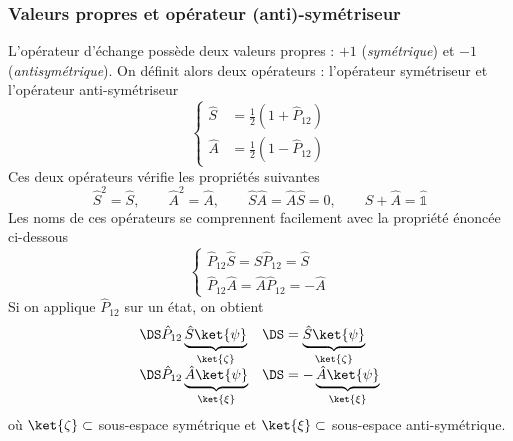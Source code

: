\subsubsection{Valeurs propres et opérateur (anti)-symétriseur}
L'opérateur d'échange possède deux valeurs propres : $+1$ (\textit{symétrique}) et $-1$ (\textit{antisymétrique}). On 
définit alors deux opérateurs : l'opérateur symétriseur et l'opérateur anti-symétriseur
\begin{equation}
\left\{\begin{array}{ll}
\hat{S} &= \frac{1}{2}\left(1+\hat{P}_{12}\right)\\
\hat{A} &= \frac{1}{2}\left(1-\hat{P}_{12}\right)
\end{array}\right.
\end{equation}
Ces deux opérateurs vérifie les propriétés suivantes
\begin{equation}
\hat{S}^2 =\hat{S},\qquad \hat{A}^2=\hat{A},\qquad \hat{S}\hat{A}=\hat{A}\hat{S} = 0, \qquad \hat{S}+\hat{A}=\hat{\mathbb{1}}
\end{equation}
Les noms de ces opérateurs se comprennent facilement avec la propriété énoncée ci-dessous
\begin{equation}
\left\{\begin{array}{ll}
\hat{P}_{12}\hat{S} = \hat{S}\hat{P}_{12} = \hat{S}\\
\hat{P}_{12}\hat{A} = \hat{A}\hat{P}_{12} = -\hat{A}
\end{array}\right.
\end{equation}
Si on applique $\hat{P}_{12}$ sur un état, on obtient
\begin{equation}
\begin{array}{ll}
\DS\hat{P}_{12}\underbrace{\hat{S}\ket{\psi}}_{\ket{\zeta}}&\DS=\underbrace{\hat{S}\ket{\psi}}_{\ket{\zeta}}\\
\DS\hat{P}_{12}\underbrace{\hat{A}\ket{\psi}}_{\ket{\xi}}&\DS=-\underbrace{\hat{A}\ket{\psi}}_{\ket{\xi}}
\end{array}
\end{equation}
où $\ket{\zeta}\subset$ sous-espace symétrique et $\ket{\xi}\subset$ sous-espace anti-symétrique.



